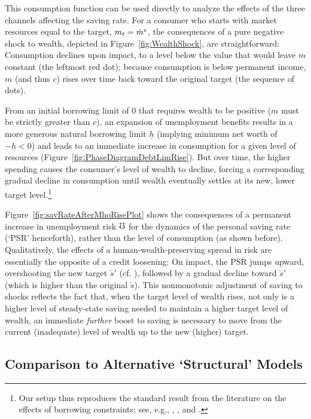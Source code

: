 \documentclass[titlepage]{\econtex}
\begin{document}
This consumption function can be used directly to analyze the effects of the three channels affecting the saving rate.  For a consumer who starts with market resources equal to the target, $m_{t}=\check{m}^{e}$, the consequences of a pure negative shock to wealth, depicted in Figure~\ref{fig:WealthShock}, are straightforward: Consumption declines upon impact, to a level below the value that would leave $m$ constant (the leftmost red dot); because consumption is below permanent income, $m$ (and thus $c$) rises over time back toward the original target (the sequence of dots).

From an initial borrowing limit of 0 that requires wealth to be positive ($m$ must be strictly greater than $c$), an expansion of unemployment benefits results in a more generous natural borrowing limit $\underline{h}$ (implying minimum net worth of $-\underline{h}<0$) and leads to an immediate increase in consumption for a given level of resources (Figure~\ref{fig:PhaseDiagramDebtLimRise}).  But over time, the higher spending causes the consumer's level of wealth to decline, forcing a corresponding gradual decline in consumption until wealth eventually settles at its new, lower target level.\footnote{Our setup thus reproduces the standard result from the literature on the effects of borrowing constraints; see, e.g., \cite{carroll:atheoryjep}, \cite{mue07}, \cite{glLiq} and \cite{hall:slump}.}

Figure~\ref{fig:savRateAfterMhoRisePlot} shows the consequences of a permanent increase in unemployment risk $\mho$ for the dynamics of the personal saving rate (`PSR' henceforth), rather than the level of consumption (as shown before).  Qualitatively, the effects of a human-wealth-preserving spread in risk are essentially the opposite of a credit loosening: On impact, the PSR jumps upward, overshooting the new target $\check{s}'$ (cf. \cite{dornbuschOvershooting}), followed by a gradual decline toward $\check{s}'$ (which is higher than the original $\check{s}$). This nonmonotonic adjustment of saving to shocks reflects the fact that, when the target level of wealth rises, not only is a higher level of steady-state saving needed to maintain a higher target level of wealth, an immediate \textit{further} boost to saving is necessary to move from the current (inadequate) level of wealth up to the new (higher) target.

\hypertarget{ssAltModels}{}\hypertarget{Comparison-with-Alternative-Frameworks}{}

\subsection{Comparison to Alternative `Structural' Models} \label{ssAltModels}
\end{document}
